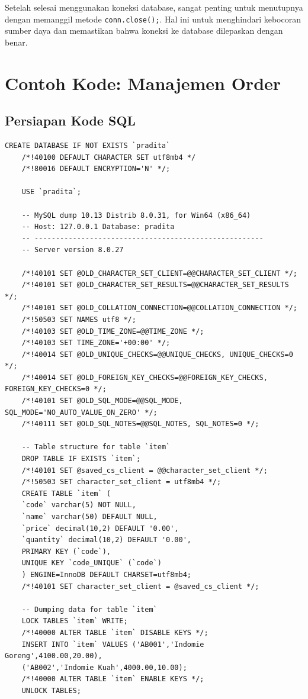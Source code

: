 Setelah selesai menggunakan koneksi database, sangat penting untuk menutupnya dengan memanggil metode \texttt{conn.close();}. Hal ini untuk menghindari kebocoran sumber daya dan memastikan bahwa koneksi ke database dilepaskan dengan benar.

\section{Contoh Kode: Manajemen Order}

\subsection{Persiapan Kode SQL}

\begin{lstlisting}[style=JavaStyle]
	CREATE DATABASE IF NOT EXISTS `pradita`
	/*!40100 DEFAULT CHARACTER SET utf8mb4 */ 
	/*!80016 DEFAULT ENCRYPTION='N' */;
	
	USE `pradita`;
	
	-- MySQL dump 10.13 Distrib 8.0.31, for Win64 (x86_64)
	-- Host: 127.0.0.1 Database: pradita
	-- ------------------------------------------------------
	-- Server version 8.0.27
	
	/*!40101 SET @OLD_CHARACTER_SET_CLIENT=@@CHARACTER_SET_CLIENT */;
	/*!40101 SET @OLD_CHARACTER_SET_RESULTS=@@CHARACTER_SET_RESULTS */;
	/*!40101 SET @OLD_COLLATION_CONNECTION=@@COLLATION_CONNECTION */;
	/*!50503 SET NAMES utf8 */;
	/*!40103 SET @OLD_TIME_ZONE=@@TIME_ZONE */;
	/*!40103 SET TIME_ZONE='+00:00' */;
	/*!40014 SET @OLD_UNIQUE_CHECKS=@@UNIQUE_CHECKS, UNIQUE_CHECKS=0 */;
	/*!40014 SET @OLD_FOREIGN_KEY_CHECKS=@@FOREIGN_KEY_CHECKS, FOREIGN_KEY_CHECKS=0 */;
	/*!40101 SET @OLD_SQL_MODE=@@SQL_MODE, SQL_MODE='NO_AUTO_VALUE_ON_ZERO' */;
	/*!40111 SET @OLD_SQL_NOTES=@@SQL_NOTES, SQL_NOTES=0 */;
	
	-- Table structure for table `item`
	DROP TABLE IF EXISTS `item`;
	/*!40101 SET @saved_cs_client = @@character_set_client */;
	/*!50503 SET character_set_client = utf8mb4 */;
	CREATE TABLE `item` (
	`code` varchar(5) NOT NULL,
	`name` varchar(50) DEFAULT NULL,
	`price` decimal(10,2) DEFAULT '0.00',
	`quantity` decimal(10,2) DEFAULT '0.00',
	PRIMARY KEY (`code`),
	UNIQUE KEY `code_UNIQUE` (`code`)
	) ENGINE=InnoDB DEFAULT CHARSET=utf8mb4;
	/*!40101 SET character_set_client = @saved_cs_client */;
	
	-- Dumping data for table `item`
	LOCK TABLES `item` WRITE;
	/*!40000 ALTER TABLE `item` DISABLE KEYS */;
	INSERT INTO `item` VALUES ('AB001','Indomie Goreng',4100.00,20.00),
	('AB002','Indomie Kuah',4000.00,10.00);
	/*!40000 ALTER TABLE `item` ENABLE KEYS */;
	UNLOCK TABLES;
	

\end{lstlisting}
